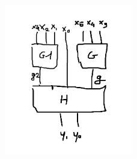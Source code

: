 \documentclass[]{article}
\begin{document}
\begin{figure}[H]
	\centering
	\includegraphics[width=0.50\textwidth]{schemat3.png}
\end{figure}
\end{document}

